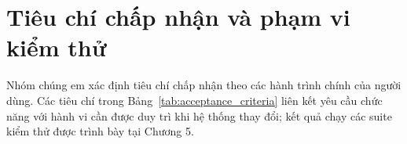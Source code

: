 



\section{Tiêu chí chấp nhận và phạm vi kiểm thử}
\label{sec:acceptance_plan}

Nhóm chúng em xác định tiêu chí chấp nhận theo các hành trình chính của người dùng. Các tiêu chí trong Bảng~\ref{tab:acceptance_criteria} liên kết yêu cầu chức năng với hành vi cần được duy trì khi hệ thống thay đổi; kết quả chạy các suite kiểm thử được trình bày tại Chương 5.

